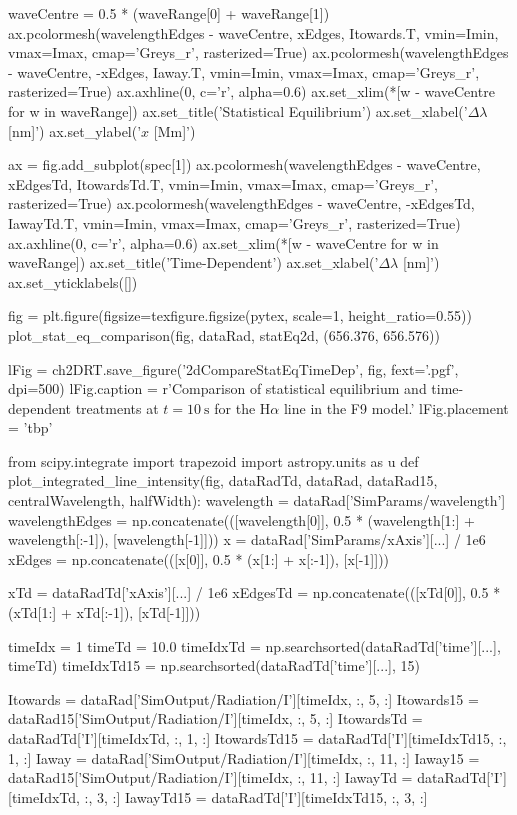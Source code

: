 \begin{pycode}[2DRT]
    waveCentre = 0.5 * (waveRange[0] + waveRange[1])
    ax.pcolormesh(wavelengthEdges - waveCentre, xEdges, Itowards.T, vmin=Imin, vmax=Imax, cmap='Greys_r', rasterized=True)
    ax.pcolormesh(wavelengthEdges - waveCentre, -xEdges, Iaway.T, vmin=Imin, vmax=Imax, cmap='Greys_r', rasterized=True)
    ax.axhline(0, c='r', alpha=0.6)
    ax.set_xlim(*[w - waveCentre for w in waveRange])
    ax.set_title('Statistical Equilibrium')
    ax.set_xlabel('$\Delta\lambda$ [nm]')
    ax.set_ylabel('$x$ [Mm]')

    ax = fig.add_subplot(spec[1])
    ax.pcolormesh(wavelengthEdges - waveCentre, xEdgesTd, ItowardsTd.T, vmin=Imin, vmax=Imax, cmap='Greys_r', rasterized=True)
    ax.pcolormesh(wavelengthEdges - waveCentre, -xEdgesTd, IawayTd.T, vmin=Imin, vmax=Imax, cmap='Greys_r', rasterized=True)
    ax.axhline(0, c='r', alpha=0.6)
    ax.set_xlim(*[w - waveCentre for w in waveRange])
    ax.set_title('Time-Dependent')
    ax.set_xlabel('$\Delta\lambda$ [nm]')
    ax.set_yticklabels([])

fig = plt.figure(figsize=texfigure.figsize(pytex, scale=1, height_ratio=0.55))
plot_stat_eq_comparison(fig, dataRad, statEq2d, (656.376, 656.576))

lFig = ch2DRT.save_figure('2dCompareStatEqTimeDep', fig, fext='.pgf', dpi=500)
lFig.caption = r'Comparison of statistical equilibrium and time-dependent treatments at $t=\SI{10}{\second}$ for the H$\alpha$ line in the F9 model.'
lFig.placement = 'tbp'

from scipy.integrate import trapezoid
import astropy.units as u
def plot_integrated_line_intensity(fig, dataRadTd, dataRad, dataRad15, centralWavelength, halfWidth):
    wavelength = dataRad['SimParams/wavelength']
    wavelengthEdges = np.concatenate(([wavelength[0]], 0.5 * (wavelength[1:] + wavelength[:-1]), [wavelength[-1]]))
    x = dataRad['SimParams/xAxis'][...] / 1e6
    xEdges = np.concatenate(([x[0]], 0.5 * (x[1:] + x[:-1]), [x[-1]]))

    xTd = dataRadTd['xAxis'][...] / 1e6
    xEdgesTd = np.concatenate(([xTd[0]], 0.5 * (xTd[1:] + xTd[:-1]), [xTd[-1]]))

    timeIdx = 1
    timeTd = 10.0
    timeIdxTd = np.searchsorted(dataRadTd['time'][...], timeTd)
    timeIdxTd15 = np.searchsorted(dataRadTd['time'][...], 15)

    Itowards = dataRad['SimOutput/Radiation/I'][timeIdx, :, 5, :]
    Itowards15 = dataRad15['SimOutput/Radiation/I'][timeIdx, :, 5, :]
    ItowardsTd = dataRadTd['I'][timeIdxTd, :, 1, :]
    ItowardsTd15 = dataRadTd['I'][timeIdxTd15, :, 1, :]
    Iaway = dataRad['SimOutput/Radiation/I'][timeIdx, :, 11, :]
    Iaway15 = dataRad15['SimOutput/Radiation/I'][timeIdx, :, 11, :]
    IawayTd = dataRadTd['I'][timeIdxTd, :, 3, :]
    IawayTd15 = dataRadTd['I'][timeIdxTd15, :, 3, :]


\end{pycode}
